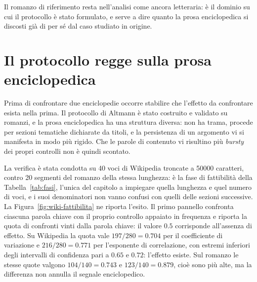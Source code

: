 Il romanzo di riferimento resta nell'analisi come ancora letteraria: è il
dominio su cui il protocollo è stato formulato, e serve a dire quanto la prosa
enciclopedica si discosti già di per sé dal caso studiato in origine.

\section{Il protocollo regge sulla prosa enciclopedica}
\label{sec:fattibilita}

Prima di confrontare due enciclopedie occorre stabilire che l'effetto da
confrontare esista nella prima. Il protocollo di Altmann è stato costruito e
validato su romanzi, e la prosa enciclopedica ha una struttura diversa: non ha
trama, procede per sezioni tematiche dichiarate da titoli, e la persistenza di
un argomento vi si manifesta in modo più rigido. Che le parole di contenuto vi
risultino più \emph{bursty} dei propri controlli non è quindi scontato.

La verifica è stata condotta su \num{40} voci di Wikipedia troncate a
\num{50000} caratteri, contro \num{20} segmenti del romanzo della stessa
lunghezza: è la fase di fattibilità della Tabella~\ref{tab:fasi}, l'unica del
capitolo a impiegare quella lunghezza e quel numero di voci, e i suoi
denominatori non vanno confusi con quelli delle sezioni successive. La
Figura~\ref{fig:wiki-fattibilita} ne riporta l'esito. Il primo
pannello confronta ciascuna parola chiave con il proprio controllo appaiato in
frequenza e riporta la quota di confronti vinti dalla parola chiave: il valore
$0.5$ corrisponde all'assenza di effetto. Su Wikipedia la quota vale
$197/280 = 0.704$ per il coefficiente di variazione e $216/280 = 0.771$ per
l'esponente di correlazione, con estremi inferiori degli intervalli di
confidenza pari a $0.65$ e $0.72$: l'effetto esiste. Sul romanzo le stesse
quote valgono $104/140 = 0.743$ e $123/140 = 0.879$, cioè sono più alte, ma la
differenza non annulla il segnale enciclopedico.

